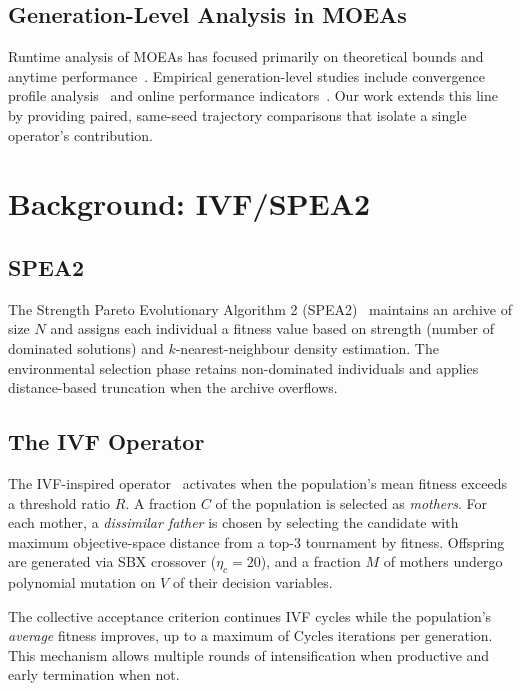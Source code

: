 \documentclass[runningheads]{llncs}
\begin{document}
\subsection{Generation-Level Analysis in MOEAs}

Runtime analysis of MOEAs has focused primarily on theoretical bounds
and anytime performance~\cite{zilberstein1996using}. Empirical
generation-level studies include convergence profile
analysis~\cite{bezerra2017comparing} and online performance
indicators~\cite{li2019quality}. Our work extends this line by providing
paired, same-seed trajectory comparisons that isolate a single
operator's contribution.


\section{Background: IVF/SPEA2}
\label{sec:background}

\subsection{SPEA2}

The Strength Pareto Evolutionary Algorithm 2
(SPEA2)~\cite{zitzler2001spea2} maintains an archive of size $N$ and
assigns each individual a fitness value based on strength (number of
dominated solutions) and $k$-nearest-neighbour density estimation. The
environmental selection phase retains non-dominated individuals and
applies distance-based truncation when the archive overflows.

\subsection{The IVF Operator}

The IVF-inspired operator~\cite{sanches2026ivfspea2} activates when the
population's mean fitness exceeds a threshold ratio $R$. A fraction $C$
of the population is selected as \emph{mothers}. For each mother, a
\emph{dissimilar father} is chosen by selecting the candidate with
maximum objective-space distance from a top-3 tournament by fitness.
Offspring are generated via SBX crossover ($\eta_c = 20$), and a
fraction $M$ of mothers undergo polynomial mutation on $V$ of their
decision variables.

The collective acceptance criterion continues IVF cycles while the
population's \emph{average} fitness improves, up to a maximum of
$\text{Cycles}$ iterations per generation. This mechanism allows
multiple rounds of intensification when productive and early termination
when not.
\end{document}

